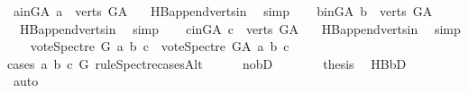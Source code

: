 \begin{isabellebody}
\ a{\isacharunderscore}{\kern0pt}in{\isacharunderscore}{\kern0pt}G{\isacharunderscore}{\kern0pt}A{\isacharcolon}{\kern0pt}\ {\isachardoublequoteopen}a\ {\isasymin}\ verts\ G{\isacharunderscore}{\kern0pt}A{\isachardoublequoteclose}\ \isamarkupfalse%
\ {}{\isacharparenleft}{\kern0pt}{}{\isacharparenright}{\kern0pt}\ HB{}{\isachardot}{\kern0pt}append{\isacharunderscore}{\kern0pt}verts{\isacharunderscore}{\kern0pt}in\ \isamarkupfalse%
\ simp\isanewline
\ \ \isamarkupfalse%
\ b{\isacharunderscore}{\kern0pt}in{\isacharunderscore}{\kern0pt}G{\isacharunderscore}{\kern0pt}A{\isacharcolon}{\kern0pt}\ {\isachardoublequoteopen}b\ {\isasymin}\ verts\ G{\isacharunderscore}{\kern0pt}A{\isachardoublequoteclose}\ \isamarkupfalse%
\ {}{\isacharparenleft}{\kern0pt}{}{\isacharparenright}{\kern0pt}\ HB{}{\isachardot}{\kern0pt}append{\isacharunderscore}{\kern0pt}verts{\isacharunderscore}{\kern0pt}in\ \isamarkupfalse%
\ simp\isanewline
\ \ \isamarkupfalse%
\ c{\isacharunderscore}{\kern0pt}in{\isacharunderscore}{\kern0pt}G{\isacharunderscore}{\kern0pt}A{\isacharcolon}{\kern0pt}\ {\isachardoublequoteopen}c\ {\isasymin}\ verts\ G{\isacharunderscore}{\kern0pt}A{\isachardoublequoteclose}\ \isamarkupfalse%
\ {}{\isacharparenleft}{\kern0pt}{}{\isacharparenright}{\kern0pt}\ HB{}{\isachardot}{\kern0pt}append{\isacharunderscore}{\kern0pt}verts{\isacharunderscore}{\kern0pt}in\ \isamarkupfalse%
\ simp\isanewline
\ \ \isamarkupfalse%
\ {\isachardoublequoteopen}vote{\isacharunderscore}{\kern0pt}Spectre\ G\ a\ b\ c\ {\isasymle}\ vote{\isacharunderscore}{\kern0pt}Spectre\ G{\isacharunderscore}{\kern0pt}A\ a\ b\ c{\isachardoublequoteclose}\isanewline
\ \ \isamarkupfalse%
{\isacharparenleft}{\kern0pt}cases\ a\ b\ c\ G\ rule{\isacharcolon}{\kern0pt}Spectre{\isacharunderscore}{\kern0pt}casesAlt{\isacharparenright}{\kern0pt}\isanewline
\ \ \ \ \isamarkupfalse%
\ no{\isacharunderscore}{\kern0pt}bD\isanewline
\ \ \ \ \isamarkupfalse%
\ \isamarkupfalse%
\ {\isacharquery}{\kern0pt}thesis\ \isamarkupfalse%
\ HB{}{\isachardot}{\kern0pt}bD\ {}{\isacharparenleft}{\kern0pt}{}{\isacharcomma}{\kern0pt}{}{\isacharcomma}{\kern0pt}{}{\isacharparenright}{\kern0pt}\ \isamarkupfalse%
\ auto\ \ \ \isanewline

\end{isabellebody}
